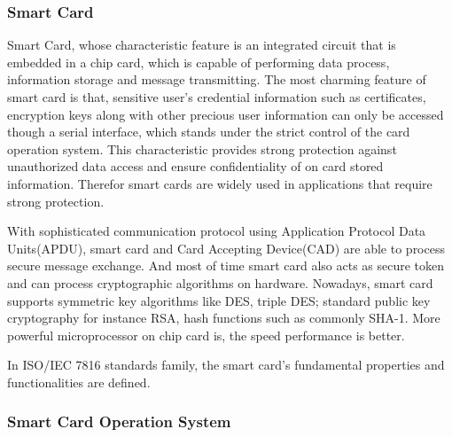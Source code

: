 \documentclass[]{llncs}
\begin{document}
\subsubsection{Smart Card}
Smart Card, whose characteristic feature is an integrated circuit that is embedded in a chip card, which is capable of performing data process, information storage and message transmitting\cite{handbuch}. The most charming feature of smart card is that, sensitive user's credential information such as certificates, encryption keys along with other precious user information can only be accessed though a serial interface, which stands under the strict control of the card operation system. This characteristic provides strong  protection against  unauthorized data access and ensure confidentiality of on card stored information. Therefor smart cards are widely used in applications that require strong protection.

With sophisticated communication protocol using Application Protocol Data Units(APDU), smart card and Card Accepting Device(CAD) are able to process secure message exchange. And most of time smart card also acts as secure token and can process cryptographic algorithms on hardware. Nowadays, smart card supports symmetric key algorithms like DES, triple DES; standard public key cryptography for instance RSA, hash functions such as commonly SHA-1\cite{handbuch}. More powerful microprocessor on chip card is, the speed performance is better.  

In ISO/IEC 7816 standards family,  the smart card's fundamental properties and functionalities are defined.

\subsubsection{Smart Card Operation System}
\subsubsection{}
\end{document}
